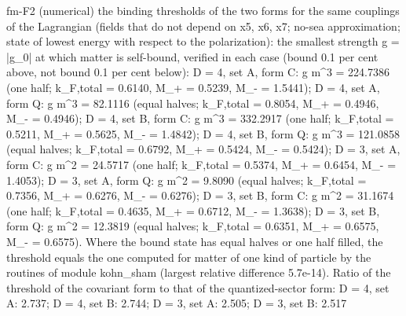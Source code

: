 \documentclass[
  10pt,
]{article}
\newenvironment{Shaded}{}{}
\newcommand{\NormalTok}[1]{#1}
\begin{document}
\begin{Shaded}
\begin{Highlighting}[]
\NormalTok{[PASS] fm{-}F2  (numerical) the binding thresholds of the two forms for the same couplings of the Lagrangian (fields that do not depend on x5, x6, x7; no{-}sea approximation; state of lowest energy with respect to the polarization): the smallest strength g = |g\_0| at which matter is self{-}bound, verified in each case (bound 0.1 per cent above, not bound 0.1 per cent below): D = 4, set A, form C: g m\^{}3 = 224.7386 (one half; k\_F,total = 0.6140, M\_+ = 0.5239, M\_{-} = 1.5441); D = 4, set A, form Q: g m\^{}3 = 82.1116 (equal halves; k\_F,total = 0.8054, M\_+ = 0.4946, M\_{-} = 0.4946); D = 4, set B, form C: g m\^{}3 = 332.2917 (one half; k\_F,total = 0.5211, M\_+ = 0.5625, M\_{-} = 1.4842); D = 4, set B, form Q: g m\^{}3 = 121.0858 (equal halves; k\_F,total = 0.6792, M\_+ = 0.5424, M\_{-} = 0.5424); D = 3, set A, form C: g m\^{}2 = 24.5717 (one half; k\_F,total = 0.5374, M\_+ = 0.6454, M\_{-} = 1.4053); D = 3, set A, form Q: g m\^{}2 = 9.8090 (equal halves; k\_F,total = 0.7356, M\_+ = 0.6276, M\_{-} = 0.6276); D = 3, set B, form C: g m\^{}2 = 31.1674 (one half; k\_F,total = 0.4635, M\_+ = 0.6712, M\_{-} = 1.3638); D = 3, set B, form Q: g m\^{}2 = 12.3819 (equal halves; k\_F,total = 0.6351, M\_+ = 0.6575, M\_{-} = 0.6575). Where the bound state has equal halves or one half filled, the threshold equals the one computed for matter of one kind of particle by the routines of module kohn\_sham (largest relative difference 5.7e{-}14). Ratio of the threshold of the covariant form to that of the quantized{-}sector form: D = 4, set A: 2.737; D = 4, set B: 2.744; D = 3, set A: 2.505; D = 3, set B: 2.517}

\end{Highlighting}
\end{Shaded}
\end{document}
